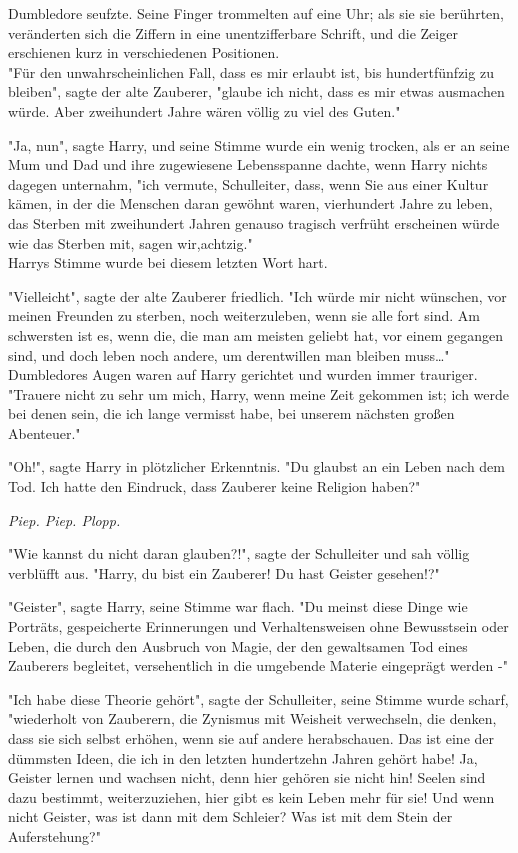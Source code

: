 {Dumbledore seufzte. Seine Finger trommelten auf eine Uhr; als sie sie berührten, veränderten sich die Ziffern in eine unentzifferbare Schrift, und die Zeiger erschienen kurz in verschiedenen Positionen.\\ "Für den unwahrscheinlichen Fall, dass es mir erlaubt ist, bis hundertfünfzig zu bleiben", sagte der alte Zauberer, "glaube ich nicht, dass es mir etwas ausmachen würde. Aber zweihundert Jahre wären völlig zu viel des Guten."

"Ja, nun", sagte Harry, und seine Stimme wurde ein wenig trocken, als er an seine Mum und Dad und ihre zugewiesene Lebensspanne dachte, wenn Harry nichts dagegen unternahm, "ich vermute, Schulleiter, dass, wenn Sie aus einer Kultur kämen, in der die Menschen daran gewöhnt waren, vierhundert Jahre zu leben, das Sterben mit zweihundert Jahren genauso tragisch verfrüht erscheinen würde wie das Sterben mit, sagen wir,achtzig."\\ Harrys Stimme wurde bei diesem letzten Wort hart.

"Vielleicht", sagte der alte Zauberer friedlich. "Ich würde mir nicht wünschen, vor meinen Freunden zu sterben, noch weiterzuleben, wenn sie alle fort sind. Am schwersten ist es, wenn die, die man am meisten geliebt hat, vor einem gegangen sind, und doch leben noch andere, um derentwillen man bleiben muss…"\\ Dumbledores Augen waren auf Harry gerichtet und wurden immer trauriger.\\ "Trauere nicht zu sehr um mich, Harry, wenn meine Zeit gekommen ist; ich werde bei denen sein, die ich lange vermisst habe, bei unserem nächsten großen Abenteuer."

"Oh!", sagte Harry in plötzlicher Erkenntnis. "Du glaubst an ein Leben nach dem Tod. Ich hatte den Eindruck, dass Zauberer keine Religion haben?"

\emph{Piep. Piep. Plopp.}

"Wie kannst du nicht daran glauben?!", sagte der Schulleiter und sah völlig verblüfft aus. "Harry, du bist ein Zauberer! Du hast Geister gesehen!?"

"Geister", sagte Harry, seine Stimme war flach. "Du meinst diese Dinge wie Porträts, gespeicherte Erinnerungen und Verhaltensweisen ohne Bewusstsein oder Leben, die durch den Ausbruch von Magie, der den gewaltsamen Tod eines Zauberers begleitet, versehentlich in die umgebende Materie eingeprägt werden -"

"Ich habe diese Theorie gehört", sagte der Schulleiter, seine Stimme wurde scharf, "wiederholt von Zauberern, die Zynismus mit Weisheit verwechseln, die denken, dass sie sich selbst erhöhen, wenn sie auf andere herabschauen. Das ist eine der dümmsten Ideen, die ich in den letzten hundertzehn Jahren gehört habe! Ja, Geister lernen und wachsen nicht, denn hier gehören sie nicht hin! Seelen sind dazu bestimmt, weiterzuziehen, hier gibt es kein Leben mehr für sie! Und wenn nicht Geister, was ist dann mit dem Schleier? Was ist mit dem Stein der Auferstehung?"

}
